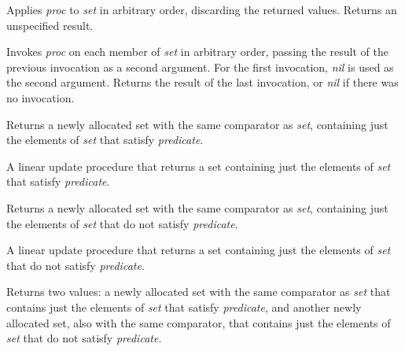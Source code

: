 \begin{entry}{%
  }

  Applies \emph{proc} to \emph{set} in arbitrary order, discarding the
  returned values. Returns an unspecified result.
\end{entry}

\begin{entry}{%
  }

  Invokes \emph{proc} on each member of \emph{set} in arbitrary order,
  passing the result of the previous invocation as a second
  argument. For the first invocation, \emph{nil} is used as the second
  argument. Returns the result of the last invocation, or \emph{nil}
  if there was no invocation.
\end{entry}

\begin{entry}{%
  }

  Returns a newly allocated set with the same comparator as
  \emph{set}, containing just the elements of \emph{set} that satisfy
  \emph{predicate}.
\end{entry}

\begin{entry}{%
  }

  A linear update procedure that returns a set containing just the
  elements of \emph{set} that satisfy \emph{predicate}.
\end{entry}

\begin{entry}{%
  }

  Returns a newly allocated set with the same comparator as
  \emph{set}, containing just the elements of \emph{set} that do not
  satisfy \emph{predicate}.
\end{entry}

\begin{entry}{%
  }

  A linear update procedure that returns a set containing just the
  elements of \emph{set} that do not satisfy \emph{predicate}.
\end{entry}

\begin{entry}{%
  }

  Returns two values: a newly allocated set with the same comparator
  as \emph{set} that contains just the elements of \emph{set} that
  satisfy \emph{predicate}, and another newly allocated set, also with
  the same comparator, that contains just the elements of \emph{set}
  that do not satisfy \emph{predicate}.
\end{entry}

